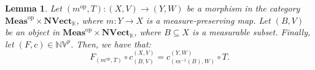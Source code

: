 \documentclass{amsart}
\theoremstyle{definition}
\theoremstyle{plain}
\newtheorem{lemma}[definition]{Lemma}
\newcommand{\opMeas}{\mathbf{Meas}^\mathrm{op}}
\newcommand{\NVect}{\mathbf{NVect}_{\mathbb{K}}}
\newcommand{\NVp}{\mathbb{NV}^p}
\begin{document}
        \begin{lemma}
        \label{lemma:functors and measure-preserving maps in the normed case}
            Let $\left( m^{\mathrm{op}},T \right) \colon (X,V) \rightarrow (Y,W)$ be a morphism in the category $\opMeas \times \NVect$, where $m \colon Y \rightarrow X$ is a measure-preserving map. 
            Let $(B,V)$ be an object in $\opMeas \times \NVect$, where $B \subseteq X$ is a measurable subset. 
            Finally, let $(F,c) \in \NVp$. 
            Then, we have that:
            \begin{equation*}
                F_{\left( m^{\mathrm{op}},T \right)} \circ c_{(B,V)}^{(X,V)} = c_{\left( m^{-1}(B),W \right)}^{(Y,W)} \circ T.
            \end{equation*}
        \end{lemma}
\end{document}
